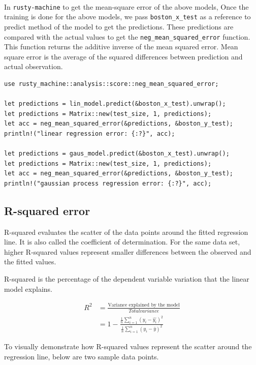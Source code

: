 \documentclass{book}
\begin{document}
\paragraph{}%
In \lstinline{rusty-machine} to get the mean-square error of the above models, Once the training is done for the above models, we pass \lstinline{boston_x_test} as a reference to predict method of the model to get the predictions. These predictions are compared with the actual values to get the \lstinline{neg_mean_squared_error} function. This function returns the additive inverse of the mean squared error. Mean square error is the average of the squared differences between prediction and actual observation.
\label{par:}

\begin{lstlisting}[caption={lin\_reg\\.rs}]
use rusty_machine::analysis::score::neg_mean_squared_error;

let predictions = lin_model.predict(&boston_x_test).unwrap();
let predictions = Matrix::new(test_size, 1, predictions);
let acc = neg_mean_squared_error(&predictions, &boston_y_test);
println!("linear regression error: {:?}", acc);

let predictions = gaus_model.predict(&boston_x_test).unwrap();
let predictions = Matrix::new(test_size, 1, predictions);
let acc = neg_mean_squared_error(&predictions, &boston_y_test);
println!("gaussian process regression error: {:?}", acc);
\end{lstlisting}
\label{sub:mae}

\subsection{R-squared error}%
R-squared evaluates the scatter of the data points around the fitted regression line. It is also called the coefficient of determination. For the same data set, higher R-squared values represent smaller differences between the observed and the fitted values.

R-squared is the percentage of the dependent variable variation that the linear model explains.

\begin{align}
	R^2 & = \frac{\text{Variance explained by the model}}{Total variance} \\
	    & = 1 - \frac{\frac{1}{n}\sum_{i=1}^{n}(y_i - \hat{y_i})^2}{\frac{1}{n}\sum_{i=1}^{n}(y_i - \bar{y})^2}
\end{align}

To visually demonstrate how R-squared values represent the scatter around the regression line, below are two sample data points.
\end{document}
